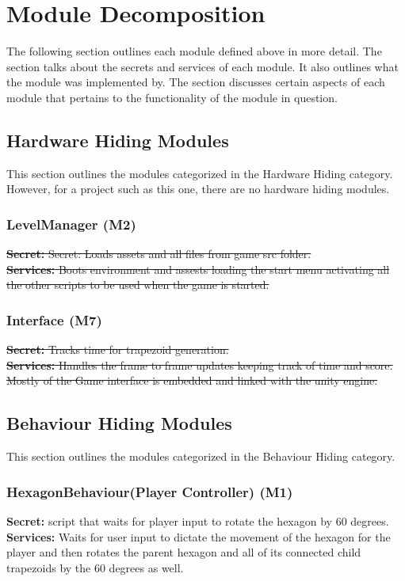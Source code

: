 \documentclass[12pt, titlepage]{article}
\begin{document}
\section{Module Decomposition}
The following section outlines each module defined above in more detail. The section talks about the secrets and services of each module. It also outlines what the module was implemented by. The section discusses certain aspects of each module that pertains to the functionality of the module in question.

\subsection{Hardware Hiding Modules}
\noindent This section outlines the modules categorized in the Hardware Hiding category. {\color{blue}However, for a project such as this one, there are no hardware hiding modules.}


\subsubsection{LevelManager (M2)}
\sout{\noindent \textbf{Secret:} Secret: Loads assets and all files from game src folder.\\
\textbf{Services:} Boots environment and assests loading the start menu activating all the other scripts to be used when the game is started.}

\subsubsection{Interface (M7)}
\sout{\noindent \textbf{Secret:} Tracks time for trapezoid generation. \\
\textbf{Services:} Handles the frame to frame updates keeping track of time and score. Mostly of the Game interface is embedded and linked with the unity engine.
}


\subsection{Behaviour Hiding Modules}
\noindent This section outlines the modules categorized in the Behaviour Hiding category.
\subsubsection{HexagonBehaviour(Player Controller) (M1)}
\noindent \textbf{Secret:} script that waits for player input to rotate the hexagon by 60 degrees.\\
\textbf{Services:} Waits for user input to dictate the movement of the hexagon for the player and then rotates the parent hexagon and all of its connected child trapezoids by the 60 degrees as well.
\end{document}
